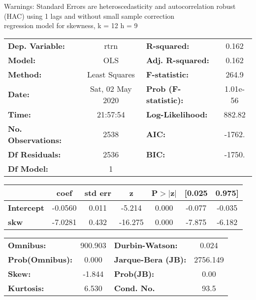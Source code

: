 Warnings: \newline
 [1] Standard Errors are heteroscedasticity and autocorrelation robust (HAC) using 1 lags and without small sample correction\\ 

regression model for skewness, k = 12 h = 9\begin{center}
\begin{tabular}{lclc}
\toprule
\textbf{Dep. Variable:}    &       rtrn       & \textbf{  R-squared:         } &     0.162   \\
\textbf{Model:}            &       OLS        & \textbf{  Adj. R-squared:    } &     0.162   \\
\textbf{Method:}           &  Least Squares   & \textbf{  F-statistic:       } &     264.9   \\
\textbf{Date:}             & Sat, 02 May 2020 & \textbf{  Prob (F-statistic):} &  1.01e-56   \\
\textbf{Time:}             &     21:57:54     & \textbf{  Log-Likelihood:    } &    882.82   \\
\textbf{No. Observations:} &        2538      & \textbf{  AIC:               } &    -1762.   \\
\textbf{Df Residuals:}     &        2536      & \textbf{  BIC:               } &    -1750.   \\
\textbf{Df Model:}         &           1      & \textbf{                     } &             \\
\bottomrule
\end{tabular}
\begin{tabular}{lcccccc}
                   & \textbf{coef} & \textbf{std err} & \textbf{z} & \textbf{P$> |$z$|$} & \textbf{[0.025} & \textbf{0.975]}  \\
\midrule
\textbf{Intercept} &      -0.0560  &        0.011     &    -5.214  &         0.000        &       -0.077    &       -0.035     \\
\textbf{skw}       &      -7.0281  &        0.432     &   -16.275  &         0.000        &       -7.875    &       -6.182     \\
\bottomrule
\end{tabular}
\begin{tabular}{lclc}
\textbf{Omnibus:}       & 900.903 & \textbf{  Durbin-Watson:     } &    0.024  \\
\textbf{Prob(Omnibus):} &   0.000 & \textbf{  Jarque-Bera (JB):  } & 2756.149  \\
\textbf{Skew:}          &  -1.844 & \textbf{  Prob(JB):          } &     0.00  \\
\textbf{Kurtosis:}      &   6.530 & \textbf{  Cond. No.          } &     93.5  \\
\bottomrule
\end{tabular}
\end{center}

